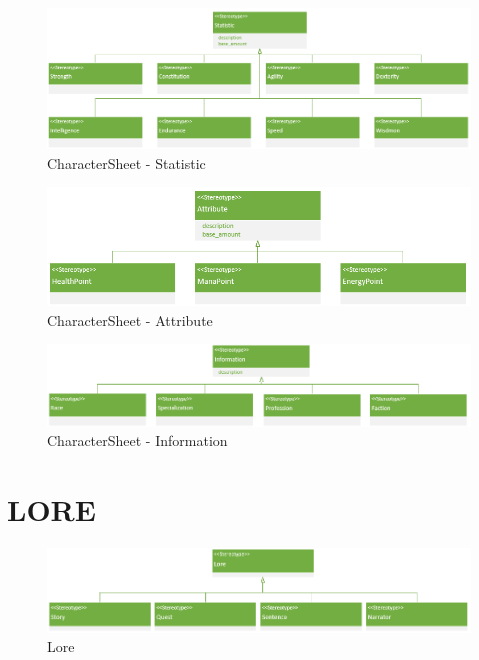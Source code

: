 \begin{figure}[H]
    \begin{center}
    \includegraphics[width=\linewidth]{10_img/Z_annexeA/cs_statistic.PNG}
    \caption{CharacterSheet - Statistic}
    \label{A-Statistic}
    \end{center}
\end{figure}


\begin{figure}[H]
    \begin{center}
    \includegraphics[width=14cm]{10_img/Z_annexeA/cs_attribute.PNG}
    \caption{CharacterSheet - Attribute}
    \label{A-Attribute}
    \end{center}
\end{figure}

\begin{figure}[H]
    \begin{center}
    \includegraphics[width=15cm]{10_img/Z_annexeA/cs_information.PNG}
    \caption{CharacterSheet - Information}
    \label{A-Information}
    \end{center}
\end{figure}


\section{LORE}
\begin{figure}[H]
    \begin{center}
    \includegraphics[width=15cm]{10_img/Z_annexeA/lore.PNG}
    \caption{Lore}
    \label{A-Lore}
    \end{center}
\end{figure}


